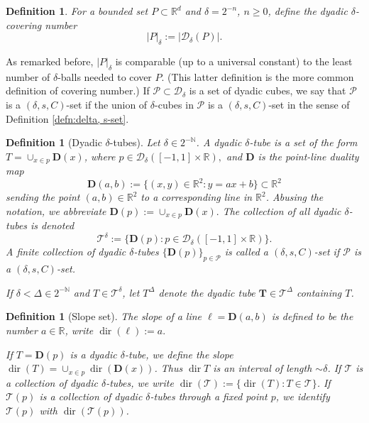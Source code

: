 \documentclass{amsart}
\newtheorem{definition}[prop]{Definition}
\newcommand{\R}{\mathbb{R}}
\newcommand{\bT}{\mathbf{T}}
\newcommand{\cD}{\mathcal{D}}
\newcommand{\cT}{\mathcal{T}}
\newcommand{\cP}{\mathcal{P}}
\DeclareMathOperator{\dir}{dir}
\begin{document}
\begin{definition}\label{defn:covering number}
    For a bounded set $P \subset \R^d$ and $\delta = 2^{-n}$, $n \ge 0$, define the dyadic $\delta$-covering number
    \begin{equation*}
        |P|_\delta := |\cD_\delta (P)|.
    \end{equation*}
\end{definition}
As remarked before, $|P|_{\delta}$ is comparable (up to a universal constant) to the least number of $\delta$-balls needed to cover $P$. (This latter definition is the more common definition of covering number.) If $\cP\subset \cD_{\delta}$ is a set of dyadic cubes, we say that $\cP$ is a $(\delta, s, C)$-set if the union  of $\delta$-cubes in $\cP$ is a $(\delta, s, C)$-set in the sense of Definition \ref{defn:delta, s-set}. 


\begin{definition}[Dyadic $\delta$-tubes]
    Let $\delta\in 2^{-\mathbb{N}}$. A \emph{dyadic $\delta$-tube} is a set of the form $T=\cup_{x\in p} \mathbf{D}(x)$, where $p\in \cD_{\delta}([-1,1]\times \mathbb{R}),$ and $\mathbf{D}$ is the \emph{point-line duality map}
\[
\mathbf{D}(a,b):=\{ (x,y)\in \mathbb{R}^2: y=ax+b\}\subset \mathbb{R}^2
\]
sending the point $(a,b)\in \mathbb{R}^2$ to a corresponding line in $\mathbb{R}^2$. Abusing the notation, we abbreviate $\mathbf{D}(p):=\cup_{x\in p} \mathbf{D}(x).$ The collection of all dyadic $\delta$-tubes is denoted 
\[
\cT^{\delta}:=\{ \mathbf{D}(p): p\in \mathcal{D}_{\delta}([-1,1]\times \mathbb{R})\}.
\]
A finite collection of dyadic $\delta$-tubes $\{\mathbf{D}(p)\}_{p\in \cP}$ is called a $(\delta, s, C)$-set if $\cP$ is a $(\delta, s, C)$-set. 

If $\delta<\Delta\in 2^{-\mathbb{N}}$ and $T\in \cT^{\delta}$, let $T^{\Delta}$ denote the dyadic tube $\bT\in \cT^{\Delta}$ containing $T$. 
\end{definition}


\begin{definition}[Slope set]
    The slope of a line $\ell=\mathbf{D}(a,b)$ is defined to be the number $a\in \mathbb{R}$, write $\dir(\ell):=a.$ 

    If $T=\mathbf{D}(p)$ is a dyadic $\delta$-tube, we define the slope $\dir(T) = \cup_{x\in p} \dir ( \mathbf{D}(x))$. Thus $\dir{T}$ is an interval of length $\sim \delta$. If $\mathcal{T}$ is a collection of dyadic $\delta$-tubes, we write $\dir(\cT):=\{\dir(T): T\in \cT\}$. If $\cT(p)$ is a collection of dyadic $\delta$-tubes through a fixed point $p$, we identify $\cT(p)$ with $\dir(\cT(p))$. 
\end{definition}
\end{document}
